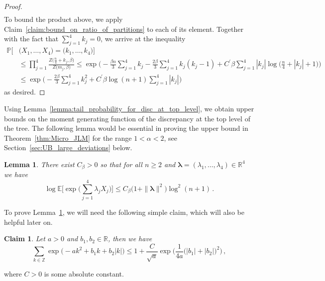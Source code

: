\documentclass[11pt]{amsart}
\newtheorem{lemma}[theorem]{Lemma}
\newtheorem{claim}[theorem]{Claim}
\theoremstyle{definition}
\theoremstyle{remark}
\numberwithin{equation}{section}
\def\la{{\lambda}}
\newcommand{\bR}{\mathbb R}
\newcommand{\bP}{\mathbb P}
\newcommand{\bE}{\mathbb E}
\begin{document}
\begin{proof}
\begin{align*}
		\end{align*}
		To bound the product above, we apply Claim~\ref{claim:bound_on_ratio_of_partitions} to each of its element. Together with the fact that $\sum_{j=1}^{4} k_j = 0$, we arrive at the inequality
		\begin{align*}
			\bP\Big[&\big(X_1,\ldots,X_4\big) = \big(k_1,\ldots,k_4\big)\Big] \\ &\le \prod_{j=1}^{4} \frac{Z\big(\frac{n}{4} + k_j,\beta\big)}{Z\big( m_j ,\beta\big)}
			\le \exp\bigg(-\frac{\beta n}{3}\sum_{j=1}^{4}k_j - \frac{2\beta}{3}\sum_{j=1}^4 k_j(k_j-1) + C^\prime \beta \sum_{j=1}^4 |k_j| \log\big(\frac{n}{4} + |k_j|+1\big) \bigg) \\
			& \le \exp\bigg(-\frac{2\beta}{3} \sum_{j=1}^4 k_j^2 + C^\prime \beta \log(n+1) \sum_{j=1}^4 |k_j|\bigg)
		\end{align*}
		as desired.
	\end{proof}
	Using Lemma~\ref{lemma:tail_probability_for_disc_at_top_level}, we obtain upper bounds on the moment generating function of the discrepancy at the top level of the tree. The following lemma would be essential in proving the upper bound in Theorem~\ref{thm:Micro_JLM} for the range $1<\alpha<2$, see Section~\ref{sec:UB_large_deviations} below.
	\begin{lemma}
		\label{lemma:moment_generating_funtion_upper_bound_top_level_no_assumption}
		There exist $C_\beta>0$ so that for all $n\ge 2$ and $\boldsymbol{\la} = (\lambda_1,\ldots,\la_4)\in \bR^4$ we have
		\begin{equation*}
			\log\bE\bigg[\exp\Big(\sum_{j=1}^{4} \la_j X_j \Big)\bigg] \le  C_\beta \big(1 + \| \boldsymbol{\la} \|^2\big)\log^2(n+1) \, .
		\end{equation*} 
	\end{lemma}
	To prove Lemma~\ref{lemma:moment_generating_funtion_upper_bound_top_level_no_assumption}, we will need the following simple claim, which will also be helpful later on.
	\begin{claim}
		\label{claim:bound_on_MGF_gaussian_and_folded}
		Let $a>0$ and $b_1,b_2\in \bR$, then we have
		\[
		\sum_{k\in \mathbb{Z}} \exp\Big(-ak^2+b_1 k + b_2 |k| \Big) \le 1+ \frac{C}{\sqrt{a}} \exp\Big(\frac{1}{4a} \big(|b_1| + |b_2|\big)^2\Big) \, , 
		\]
	\end{claim}
	where $C>0$ is some absolute constant.
\end{document}
